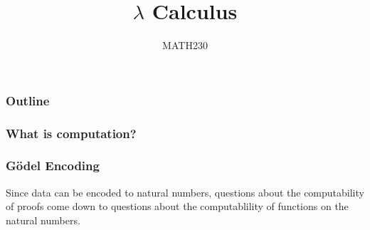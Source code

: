 \documentclass{beamer}
\title{$\lambda$ Calculus}
\author{MATH230}
\institute{Te Kura P\=angarau \\ Te Whare W\=ananga o Waitaha}
\date{}
\begin{document}
\begin{frame}

  \titlepage

\end{frame}

\begin{frame}
  \frametitle{Outline}

  \tableofcontents

\end{frame}

\begin{frame}
	\frametitle{What is computation?}
	
	

	

\end{frame}

\begin{frame}
	\frametitle{G\"{o}del Encoding}

	Since data can be encoded to natural numbers, questions about the computability of proofs come down to questions about the computablility of functions on the natural numbers. 
	
	\vspace{50mm}

\end{frame}
\end{document}
